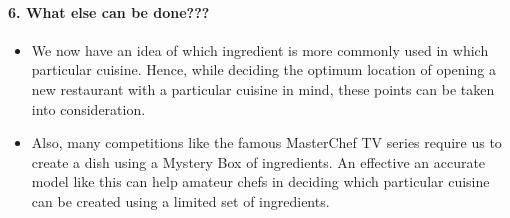 \documentclass{article}
\begin{document}
\paragraph{6. What else can be done???}\label{what-else-can-be-done}

\begin{itemize}
\tightlist
\item
  We now have an idea of which ingredient is more commonly used in which
  particular cuisine. Hence, while deciding the optimum location of
  opening a new restaurant with a particular cuisine in mind, these
  points can be taken into consideration.
\item
  Also, many competitions like the famous MasterChef TV series require
  us to create a dish using a Mystery Box of ingredients. An effective
  an accurate model like this can help amateur chefs in deciding which
  particular cuisine can be created using a limited set of ingredients.
\end{itemize}


    
    
    
    
\end{document}
